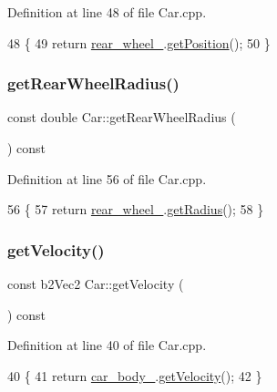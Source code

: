 Definition at line 48 of file Car.\+cpp.


\begin{DoxyCode}
48                                               \{
49     \textcolor{keywordflow}{return} \hyperlink{classCar_a2c29a444d66ee10134352516e42c3e0d}{rear\_wheel\_}.\hyperlink{classWheel_a645ce5d8595047c6774f936794e3f543}{getPosition}();
50 \}
\end{DoxyCode}
\mbox{\label{classCar_aeb0e2313eb141c7977f3c1a9a2737933}} 
\subsubsection{\texorpdfstring{get\+Rear\+Wheel\+Radius()}{getRearWheelRadius()}}
{\footnotesize\ttfamily const double Car\+::get\+Rear\+Wheel\+Radius (\begin{DoxyParamCaption}{ }\end{DoxyParamCaption}) const}



Definition at line 56 of file Car.\+cpp.


\begin{DoxyCode}
56                                            \{
57     \textcolor{keywordflow}{return} \hyperlink{classCar_a2c29a444d66ee10134352516e42c3e0d}{rear\_wheel\_}.\hyperlink{classWheel_a224ac73d325efb3cdc389a36d54ca10b}{getRadius}();
58 \}
\end{DoxyCode}
\mbox{\label{classCar_a3be84dd5291ab0fcd0110b78d8757cc1}} 
\subsubsection{\texorpdfstring{get\+Velocity()}{getVelocity()}}
{\footnotesize\ttfamily const b2\+Vec2 Car\+::get\+Velocity (\begin{DoxyParamCaption}{ }\end{DoxyParamCaption}) const}



Definition at line 40 of file Car.\+cpp.


\begin{DoxyCode}
40                                    \{
41     \textcolor{keywordflow}{return} \hyperlink{classCar_a6a0d40752a134fb4f0693a28a4e64a0d}{car\_body\_}.\hyperlink{classCarBody_aac28c2ac7e21b88ebc85f9999bac9b3d}{getVelocity}();
42 \}
\end{DoxyCode}
\mbox{\label{classCar_a681870b52aa9ad835ddbfcf74ceee84d}} 

